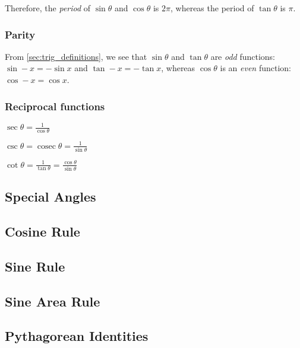 \documentclass[a4paper,11pt]{article}
\begin{document}
    Therefore, the \textit{period} of $\sin \theta$ and $\cos \theta$ is $2\pi$,
    whereas the period of $\tan \theta$ is $\pi$.

    \subsubsection{Parity} \label{sec:trig_parity}

    From \ref{sec:trig_definitions}, we see that $\sin \theta$ and $\tan \theta$
    are \textit{odd} functions:
    \\$\sin -x = -\sin x$ and $\tan -x = -\tan x$,
    whereas $\cos \theta$ is an \textit{even} function:
    \\$\cos -x = \cos x$.

    \subsubsection{Reciprocal functions} \label{sec:trig_reciprocal}

    $\displaystyle\sec \theta = \frac{1}{\cos \theta}$

    $\displaystyle\csc \theta = \operatorname{cosec} \theta
        = \frac{1}{\sin \theta}$

    $\displaystyle\cot \theta = \frac{1}{\tan \theta}
        = \frac{\cos \theta}{\sin \theta}$

    \subsection{Special Angles}


    \subsection{Cosine Rule}

    \subsection{Sine Rule}

    \subsection{Sine Area Rule}

    \subsection{Pythagorean Identities} \label{sec:trig_pythag}
\end{document}

